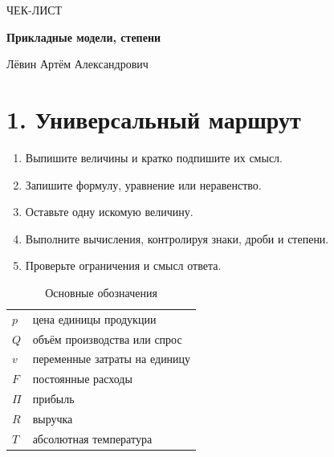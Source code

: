 \documentclass[a4paper,12pt]{article}
\begin{document}
\begin{titlepage}\thispagestyle{empty}\centering\vspace*{2.7cm}
{\Large\textcolor{darkaccent}{ЧЕК-ЛИСТ}\par}\vspace{.7cm}
{\huge\bfseries Прикладные модели, степени\par}\vspace{.15cm}{\huge\bfseries и линейная функция\par}
\vspace{.8cm}{\large Повторение ключевых методов решения задач\par}\vfill
{\large Лёвин Артём Александрович\par}\vspace{.15cm}{\large эксклюзивно для Ксении Клыковой\par}\vspace{.45cm}{\large 31 июля 2026 года\par}
\end{titlepage}
\section*{1. Универсальный маршрут}
\begin{enumerate}
\item Выпишите величины и кратко подпишите их смысл.
\item Запишите формулу, уравнение или неравенство.
\item Оставьте одну искомую величину.
\item Выполните вычисления, контролируя знаки, дроби и степени.
\item Проверьте ограничения и смысл ответа.
\end{enumerate}
\begin{table}[ht]\centering\caption{Основные обозначения}\begin{tabularx}{\linewidth}{@{}lX@{}}\toprule
$p$ & цена единицы продукции\\
$Q$ & объём производства или спрос\\
$v$ & переменные затраты на единицу\\
$F$ & постоянные расходы\\
$\Pi$ & прибыль\\
$R$ & выручка\\
$T$ & абсолютная температура\\\bottomrule\end{tabularx}\end{table}
\end{document}
